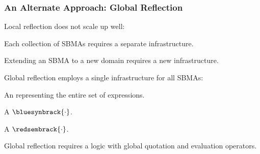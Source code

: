 \documentclass[t,12pt,numbers,fleqn]{beamer}
\begin{document}
\begin{frame}
\frametitle{An Alternate Approach: Global Reflection}
\bi

  \item Local reflection does not scale up well:

  \bi

    \item Each collection of SBMAs requires a separate infrastructure.

    \item Extending an SBMA to a new domain requires a new
      infrastructure.

  \ei

  \item Global reflection employs a single infrastructure for all
    SBMAs:

  \be

    \item An  representing the entire set of expressions.

    \item A  $\bluesynbrack{\cdot}$.

    \item A  $\redsembrack{\cdot}$.

  \ee

  \item Global reflection requires a logic with global quotation and
    evaluation operators.

  \item {}

\iffalse
  \item To test the viability of global reflection, we want to
    incorporate global quotation and evaluation into a traditional
    logic.
\fi

\ei
\end{frame}

\end{document}
